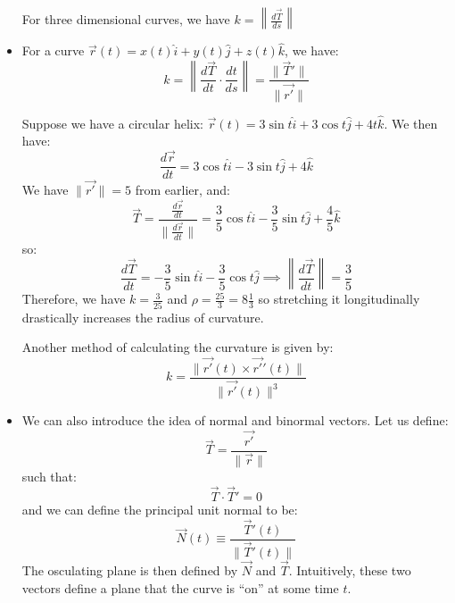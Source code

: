 \begin{itemize}
\begin{equation}
    \end{equation}
    \begin{definition}
        For three dimensional curves, we have $k= \left\lVert \frac{d\vec{T}}{ds} \right\rVert$
    \end{definition}
    \item For a curve $\vec{r}(t) = x(t)\hat{i} + y(t)\hat{j} + z(t) \hat{k}$, we have:
    \begin{equation}
        k = \left\lVert \frac{d\vec{T}}{dt} \cdot \frac{dt}{ds}\right\rVert = \frac{\lVert \vec{T}' \rVert}{\lVert \vec{r'} \rVert}
    \end{equation}
    \begin{example}
        Suppose we have a circular helix: $\vec{r}(t) = 3\sin t \hat{i} + 3\cos t\hat{j} + 4t\hat{k}$. We then have:
        \begin{equation}
            \frac{d\vec{r}}{dt} = 3\cos t \hat{i} - 3\sin t \hat{j} + 4\hat{k}
        \end{equation}
        We have $\lVert \vec{r'} \rVert = 5$ from earlier, and:
        \begin{equation}
            \vec{T} = \frac{\frac{d\vec{r}}{dt}}{\lVert \frac{d\vec{r}}{dt} \rVert} = \frac{3}{5}\cos t\hat{i} - \frac{3}{5}\sin t \hat{j} + \frac{4}{5}\hat{k}
        \end{equation}
        so:
        \begin{equation}
            \frac{d\vec{T}}{dt} = - \frac{3}{5}\sin t \hat{i} - \frac{3}{5}\cos t\hat{j} \implies \left\lVert \frac{d\vec{T}}{dt} \right\rVert = \frac{3}{5}
        \end{equation}
        Therefore, we have $k=\frac{3}{25}$ and $\rho = \frac{25}{3} = 8\frac{1}{3}$ so stretching it longitudinally drastically increases the radius of curvature.
    \end{example}
    \begin{idea}
        Another method of calculating the curvature is given by:
        \begin{equation}
            k = \frac{\lVert \vec{r'}(t) \times \vec{r'}'(t)\rVert}{\lVert\vec{r'}(t)\rVert^3}
        \end{equation}
    \end{idea}
    \item We can also introduce the idea of normal and binormal vectors. Let us define:
    \begin{equation}
        \vec{T} = \frac{\vec{r'}}{\lVert \vec{r} \rVert}
    \end{equation}
    such that:
    \begin{equation}
        \vec{T} \cdot \vec{T}' = 0
    \end{equation}
    and we can define the principal unit normal to be:
    \begin{equation}
        \vec{N}(t) \equiv \frac{\vec{T}'(t)}{\lVert \vec{T}'(t) \rVert}
    \end{equation}
    The osculating plane is then defined by $\vec{N}$ and $\vec{T}$. Intuitively, these two vectors define a plane that the curve is ``on'' at some time $t$.
\end{itemize}